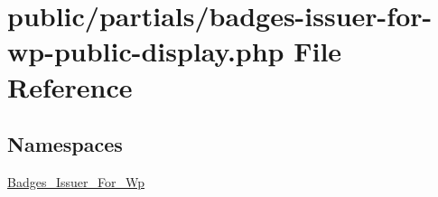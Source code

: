 \hypertarget{badges-issuer-for-wp-public-display_8php}{}\section{public/partials/badges-\/issuer-\/for-\/wp-\/public-\/display.php File Reference}
\label{badges-issuer-for-wp-public-display_8php}
\subsection*{Namespaces}
\begin{DoxyCompactItemize}
\item 
 \hyperlink{namespace_badges___issuer___for___wp}{Badges\+\_\+\+Issuer\+\_\+\+For\+\_\+\+Wp}
\end{DoxyCompactItemize}
